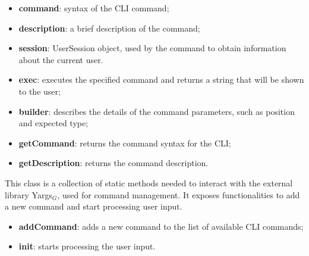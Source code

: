 					\begin{itemize}
						\item \textbf{command}: syntax of the CLI command;
						\item \textbf{description}: a brief description of the command;
						\item \textbf{session}: UserSession object, used by the command to obtain information about the current user.
					\end{itemize}
				
					\begin{itemize}
						\item \textbf{exec}: executes the specified command and returns a string that will be shown to the user;
						\item \textbf{builder}: describes the details of the command parameters, such as position and expected type;
						\item \textbf{getCommand}: returns the command syntax for the CLI;
						\item \textbf{getDescription}: returns the command description.
					\end{itemize}
	
			This class is a collection of static methods needed to interact with the external library Yargs$_{G}$, used for command management. It exposes functionalities to add a new command and start processing user input. 
					\begin{itemize}
						\item \textbf{addCommand}: adds a new command to the list of available CLI commands;
						\item \textbf{init}: starts processing the user input.
					\end{itemize}
			
